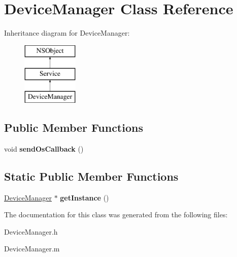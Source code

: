 \hypertarget{interface_device_manager}{
\section{\-Device\-Manager \-Class \-Reference}
\label{interface_device_manager}
}
\-Inheritance diagram for \-Device\-Manager\-:\begin{figure}[H]
\begin{center}
\leavevmode
\includegraphics[height=3.000000cm]{interface_device_manager}
\end{center}
\end{figure}
\subsection*{\-Public \-Member \-Functions}
\begin{DoxyCompactItemize}
\item 
\hypertarget{interface_device_manager_afc1f37b13b771832a2183a25eb7a4de0}{
void {\bfseries send\-Os\-Callback} ()}
\label{interface_device_manager_afc1f37b13b771832a2183a25eb7a4de0}

\end{DoxyCompactItemize}
\subsection*{\-Static \-Public \-Member \-Functions}
\begin{DoxyCompactItemize}
\item 
\hypertarget{interface_device_manager_ace872b81a071feeb70b2b4ddaee4d86b}{
\hyperlink{interface_device_manager}{\-Device\-Manager} $\ast$ {\bfseries get\-Instance} ()}
\label{interface_device_manager_ace872b81a071feeb70b2b4ddaee4d86b}

\end{DoxyCompactItemize}


\-The documentation for this class was generated from the following files\-:\begin{DoxyCompactItemize}
\item 
\-Device\-Manager.\-h\item 
\-Device\-Manager.\-m\end{DoxyCompactItemize}
